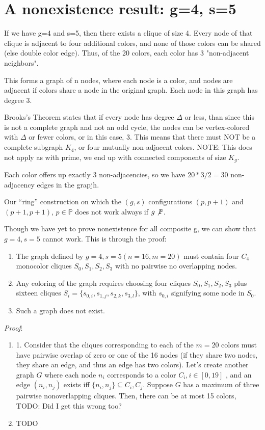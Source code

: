 \documentclass[11pt, oneside]{article} 	%
\begin{document}
\section{A nonexistence result: g=4, s=5}

If we have g=4 and s=5, then there exists a clique of size 4.  Every node of that clique is adjacent to four additional colors, and none of those colors can be shared (else double color edge).
Thus, of the 20 colors, each color has 3 "non-adjacent neighbors".

This forms a graph of n nodes, where each node is a color, and nodes are adjacent if colors share a node in the original graph.  Each node in this graph has degree 3.

Brooks's Theorem\cite{1} states that if every node has degree $\Delta$ or less, than since this is not a complete graph and not an odd cycle, the nodes can be vertex-colored with $\Delta$ or fewer colors, or in this case, 3.  This means that there must NOT be a complete subgraph $K_4$, or four mutually non-adjacent colors.  NOTE: This does not apply as with prime, we end up with connected components of size $K_g$.

Each color offers up exactly 3 non-adjacencies, so we have $20 * 3 / 2 = 30$ non-adjacency edges in the grapjh.
 
Our ``ring'' construction  on which the $(g, s)$ configurations $(p, p+1)$ and $(p+1, p+1)$, $p \in \mathbb{P}$ does not work always if $g \not \mathbb{P}$.

Though we have yet to prove nonexistence for all composite g, we can show that $g=4, s=5$ cannot work.  This is through the proof:
\begin{enumerate}
\item The graph defined by $g=4, s=5 (n=16, m=20)$ must contain four $C_4$ monocolor cliques $S_0, S_1, S_2, S_3$ with no pairwise no overlapping nodes.
\item Any coloring of the graph requires choosing four cliques  $S_0, S_1, S_2, S_3$ plus sixteen cliques $S_i = \{s_{0, i}, s_{1,j}, s_{2, k}, s_{3,l}\}$, with $s_{0, i}$ signifying some node in $S_0$.
\item Such a graph does not exist.
\end{enumerate}

\emph{Proof}: 
\begin{enumerate}
\item 1. Consider that the cliques corresponding to each of the $m=20$ colors must have pairwise overlap of zero or one of the 16 nodes (if they share two nodes, they share an edge, and thus an edge has two colors).  Let's create another graph $G$ where each node $n_i$ corresponds to a color $C_i, i \in [0,19]$ , and an edge $(n_i, n_j)$ exists iff $\{n_i, n_j\} \subseteq C_i, C_j$.  Suppose $G$ has a maximum of three pairwise nonoverlapping cliques.  Then, there can be at most 15 colors, TODO: Did I get this wrong too?
\item TODO
\end{enumerate}
\end{document}
